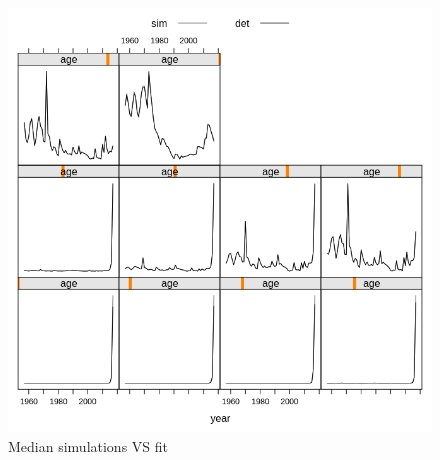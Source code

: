 \documentclass[a4paper,english,10pt]{article}\usepackage[]{graphicx}\usepackage[]{color}
\newenvironment{knitrout}{}{} %
\begin{document}
\begin{knitrout}
\color{fgcolor}\begin{figure}[H]

{\centering \includegraphics[width=.9\linewidth]{figure/sim-1} 

}

\caption[Median simulations VS fit]{Median simulations VS fit}\label{fig:sim}
\end{figure}


\end{knitrout}
\end{document}
